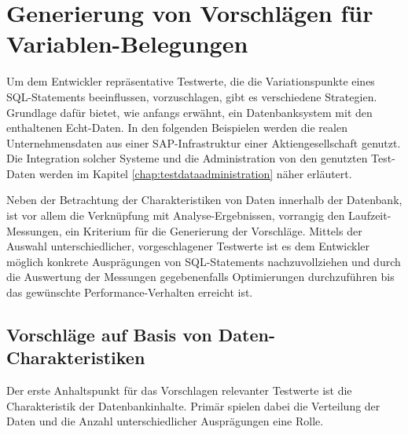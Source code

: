 \section{Generierung von Vorschlägen für Variablen-Belegungen}\label{chap:testdatasuggestions}

%
%


Um dem Entwickler repräsentative Testwerte, die die Variationspunkte eines SQL-Statements beeinflussen, vorzuschlagen, gibt es verschiedene Strategien.
Grundlage dafür bietet, wie anfangs erwähnt, ein Datenbanksystem mit den enthaltenen Echt-Daten.
In den folgenden Beispielen werden die realen Unternehmensdaten aus einer SAP-Infrastruktur einer Aktiengesellschaft genutzt.
Die Integration solcher Systeme und die Administration von den genutzten Test-Daten werden im Kapitel \ref{chap:testdataadministration} näher erläutert.

Neben der Betrachtung der Charakteristiken von Daten innerhalb der Datenbank, ist vor allem die Verknüpfung mit Analyse-Ergebnissen, vorrangig den Laufzeit-Messungen, ein Kriterium für die Generierung der Vorschläge.
Mittels der Auswahl unterschiedlicher, vorgeschlagener Testwerte ist es dem Entwickler möglich konkrete Ausprägungen von SQL-Statements nachzuvollziehen und durch die Auswertung der Messungen gegebenenfalls Optimierungen durchzuführen bis das gewünschte Performance-Verhalten erreicht ist.


\subsection{Vorschläge auf Basis von Daten-Charakteristiken}\label{chap:datacharacteristics}
Der erste Anhaltspunkt für das Vorschlagen relevanter Testwerte ist die Charakteristik der Datenbankinhalte.
Primär spielen dabei die Verteilung der Daten und die Anzahl unterschiedlicher Ausprägungen eine Rolle.


